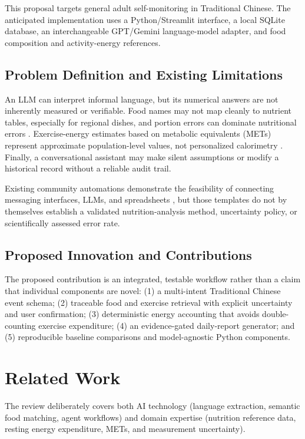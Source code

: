 \documentclass[journal,10pt]{IEEEtran}
\begin{document}
This proposal targets general adult self-monitoring in Traditional Chinese. The anticipated implementation uses a Python/Streamlit interface, a local SQLite database, an interchangeable GPT/Gemini language-model adapter, and food composition and activity-energy references.
\subsection{Problem Definition and Existing Limitations}
An LLM can interpret informal language, but its numerical answers are not inherently measured or verifiable. Food names may not map cleanly to nutrient tables, especially for regional dishes, and portion errors can dominate nutritional errors \cite{lemay,nutrients,imageeval,diabot}. Exercise-energy estimates based on metabolic equivalents (METs) represent approximate population-level values, not personalized calorimetry \cite{compendium}. Finally, a conversational assistant may make silent assumptions or modify a historical record without a reliable audit trail.

Existing community automations demonstrate the feasibility of connecting messaging interfaces, LLMs, and spreadsheets \cite{n8none,n8ntwo}, but those templates do not by themselves establish a validated nutrition-analysis method, uncertainty policy, or scientifically assessed error rate.
\subsection{Proposed Innovation and Contributions}
The proposed contribution is an integrated, testable workflow rather than a claim that individual components are novel: (1) a multi-intent Traditional Chinese event schema; (2) traceable food and exercise retrieval with explicit uncertainty and user confirmation; (3) deterministic energy accounting that avoids double-counting exercise expenditure; (4) an evidence-gated daily-report generator; and (5) reproducible baseline comparisons and model-agnostic Python components.

\section{Related Work}
The review deliberately covers both AI technology (language extraction, semantic food matching, agent workflows) and domain expertise (nutrition reference data, resting energy expenditure, METs, and measurement uncertainty).
\end{document}
